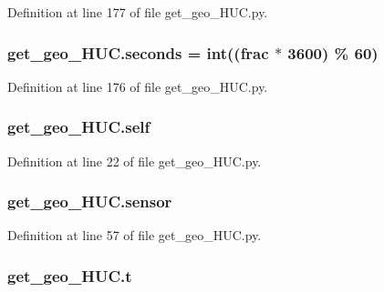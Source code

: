 Definition at line 177 of file get\+\_\+geo\+\_\+\+H\+U\+C.\+py.

\subsubsection[{\texorpdfstring{seconds}{seconds}}]{\setlength{\rightskip}{0pt plus 5cm}get\+\_\+geo\+\_\+\+H\+U\+C.\+seconds = int(({\bf frac} $\ast$ 3600) \% 60)}\hypertarget{namespaceget__geo___h_u_c_aa2aecbc23891c0a903200e79ea8aed8a}{}\label{namespaceget__geo___h_u_c_aa2aecbc23891c0a903200e79ea8aed8a}


Definition at line 176 of file get\+\_\+geo\+\_\+\+H\+U\+C.\+py.

\subsubsection[{\texorpdfstring{self}{self}}]{\setlength{\rightskip}{0pt plus 5cm}get\+\_\+geo\+\_\+\+H\+U\+C.\+self}\hypertarget{namespaceget__geo___h_u_c_a5d34137420af63fc8dd32374dead14a8}{}\label{namespaceget__geo___h_u_c_a5d34137420af63fc8dd32374dead14a8}


Definition at line 22 of file get\+\_\+geo\+\_\+\+H\+U\+C.\+py.

\subsubsection[{\texorpdfstring{sensor}{sensor}}]{\setlength{\rightskip}{0pt plus 5cm}get\+\_\+geo\+\_\+\+H\+U\+C.\+sensor}\hypertarget{namespaceget__geo___h_u_c_abd10e556b8081f3cd80bff1a987455af}{}\label{namespaceget__geo___h_u_c_abd10e556b8081f3cd80bff1a987455af}


Definition at line 57 of file get\+\_\+geo\+\_\+\+H\+U\+C.\+py.

\subsubsection[{\texorpdfstring{t}{t}}]{\setlength{\rightskip}{0pt plus 5cm}get\+\_\+geo\+\_\+\+H\+U\+C.\+t}\hypertarget{namespaceget__geo___h_u_c_a5e43010bf41ec0eb1eb43403e310e26e}{}\label{namespaceget__geo___h_u_c_a5e43010bf41ec0eb1eb43403e310e26e}


